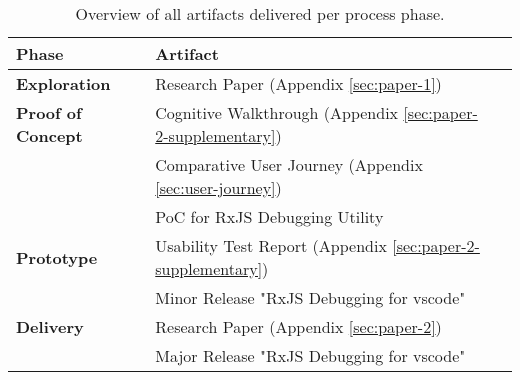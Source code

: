 
\begin{table}[h]
  \label{tbl:artifact-overview}
  \caption{Overview of all artifacts delivered per process phase.}

  \newcommand\Tstrut{\rule{0pt}{2.6ex}}       %
  \newcommand\Bstrut{\rule[-0.9ex]{0pt}{0pt}} %
  \newcommand{\TBstrut}{\Tstrut\Bstrut} %

  \begin{tabular}{llp{7.37cm}}
    \textbf{Phase}                              & \textbf{Artifact}                                     \TBstrut \\
    \hline
    \textbf{Exploration}                        & Research Paper (Appendix \ref{sec:paper-1})                                       \TBstrut \\
    \hline
    \textbf{Proof of Concept}  & Cognitive Walkthrough (Appendix \ref{sec:paper-2-supplementary})                                \TBstrut \\
                                               & Comparative User Journey (Appendix \ref{sec:user-journey})                              \Bstrut  \\
                                               & PoC for RxJS Debugging Utility                        \Bstrut \\
    \hline
    \textbf{Prototype}         & Usability Test Report (Appendix \ref{sec:paper-2-supplementary})                               \TBstrut  \\
                                               & Minor Release "RxJS Debugging for vscode" \Bstrut \\
    \hline
    \textbf{Delivery}          & Research Paper (Appendix \ref{sec:paper-2})                                      \TBstrut  \\
                                               & Major Release "RxJS Debugging for vscode" \Bstrut \\
    \hline
  \end{tabular}
\end{table}
